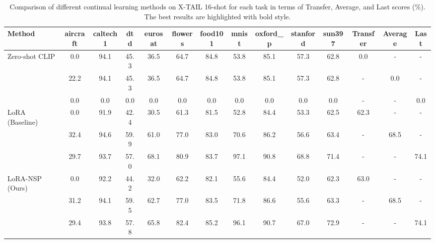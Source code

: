 \begin{table}[t]
\centering
\caption{Comparison of different continual learning methods on X-TAIL 16-shot for each task in terms of Transfer, Average, and Last scores (\%). The best results are highlighted with bold style.}
\label{tab:main_results}
\begin{tabular}{lccccccccccccc}
\toprule
Method & aircraft & caltech1 & dtd & eurosat & flowers & food101 & mnist & oxford_p & stanford & sun397 & Transfer & Average & Last \\
\midrule
Zero-shot CLIP & 0.0 & 94.1 & 45.3 & 36.5 & 64.7 & 84.8 & 53.8 & 85.1 & 57.3 & 62.8 & 0.0 & - & - \\
 & 22.2 & 94.1 & 45.3 & 36.5 & 64.7 & 84.8 & 53.8 & 85.1 & 57.3 & 62.8 & - & 0.0 & - \\
 & 0.0 & 0.0 & 0.0 & 0.0 & 0.0 & 0.0 & 0.0 & 0.0 & 0.0 & 0.0 & - & - & 0.0 \\
LoRA (Baseline) & 0.0 & 91.9 & 42.4 & 30.5 & 61.3 & 81.5 & 52.8 & 84.4 & 53.3 & 62.5 & 62.3 & - & - \\
 & 32.4 & 94.6 & 59.9 & 61.0 & 77.0 & 83.0 & 70.6 & 86.2 & 56.6 & 63.4 & - & 68.5 & - \\
 & 29.7 & 93.7 & 57.0 & 68.1 & 80.9 & 83.7 & 97.1 & 90.8 & 68.8 & 71.4 & - & - & 74.1 \\
LoRA-NSP (Ours) & 0.0 & 92.2 & 44.2 & 32.0 & 62.2 & 82.1 & 55.6 & 84.4 & 52.0 & 62.3 & 63.0 & - & - \\
 & 31.2 & 94.1 & 59.5 & 62.7 & 77.0 & 83.5 & 71.8 & 86.6 & 55.6 & 63.3 & - & 68.5 & - \\
 & 29.4 & 93.8 & 57.8 & 65.8 & 82.4 & 85.2 & 96.1 & 90.7 & 67.0 & 72.9 & - & - & 74.1 \\
\bottomrule
\end{tabular}
\end{table}